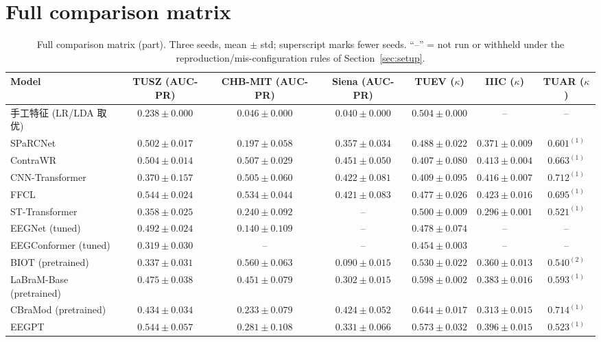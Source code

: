 \section{Full comparison matrix}
\label{app:matrix}

\begin{table}[h]
\centering
\scriptsize
\caption{Full comparison matrix (part). Three seeds, mean $\pm$ std; superscript marks fewer seeds. ``--'' = not run or withheld under the reproduction/mis-configuration rules of Section~\ref{sec:setup}.}
\begin{tabular}{lcccccc}
\toprule
Model & TUSZ (AUC-PR) & CHB-MIT (AUC-PR) & Siena (AUC-PR) & TUEV ($\kappa$) & IIIC ($\kappa$) & TUAR ($\kappa$) \\
\midrule
手工特征 (LR/LDA 取优) & $0.238 \pm 0.000$ & $0.046 \pm 0.000$ & $0.040 \pm 0.000$ & $0.504 \pm 0.000$ & -- & -- \\
SPaRCNet & $0.502 \pm 0.017$ & $0.197 \pm 0.058$ & $0.357 \pm 0.034$ & $0.488 \pm 0.022$ & $0.371 \pm 0.009$ & $0.601^{(1)}$ \\
ContraWR & $0.504 \pm 0.014$ & $0.507 \pm 0.029$ & $0.451 \pm 0.050$ & $0.407 \pm 0.080$ & $0.413 \pm 0.004$ & $0.663^{(1)}$ \\
CNN-Transformer & $0.370 \pm 0.157$ & $0.505 \pm 0.060$ & $0.422 \pm 0.081$ & $0.409 \pm 0.095$ & $0.416 \pm 0.007$ & $0.712^{(1)}$ \\
FFCL & $0.544 \pm 0.024$ & $0.534 \pm 0.044$ & $0.421 \pm 0.083$ & $0.477 \pm 0.026$ & $0.423 \pm 0.016$ & $0.695^{(1)}$ \\
ST-Transformer & $0.358 \pm 0.025$ & $0.240 \pm 0.092$ & -- & $0.500 \pm 0.009$ & $0.296 \pm 0.001$ & $0.521^{(1)}$ \\
EEGNet (tuned) & $0.492 \pm 0.024$ & $0.140 \pm 0.109$ & -- & $0.478 \pm 0.074$ & -- & -- \\
EEGConformer (tuned) & $0.319 \pm 0.030$ & -- & -- & $0.454 \pm 0.003$ & -- & -- \\
BIOT (pretrained) & $0.337 \pm 0.031$ & $0.560 \pm 0.063$ & $0.090 \pm 0.015$ & $0.530 \pm 0.022$ & $0.360 \pm 0.013$ & $0.540^{(2)}$ \\
LaBraM-Base (pretrained) & $0.475 \pm 0.038$ & $0.451 \pm 0.079$ & $0.302 \pm 0.015$ & $0.598 \pm 0.002$ & $0.383 \pm 0.016$ & $0.593^{(1)}$ \\
CBraMod (pretrained) & $0.434 \pm 0.034$ & $0.233 \pm 0.079$ & $0.424 \pm 0.052$ & $0.644 \pm 0.017$ & $0.313 \pm 0.015$ & $0.714^{(1)}$ \\
EEGPT & $0.544 \pm 0.057$ & $0.281 \pm 0.108$ & $0.331 \pm 0.066$ & $0.573 \pm 0.032$ & $0.396 \pm 0.015$ & $0.523^{(1)}$ \\

\end{tabular}
\end{table}
